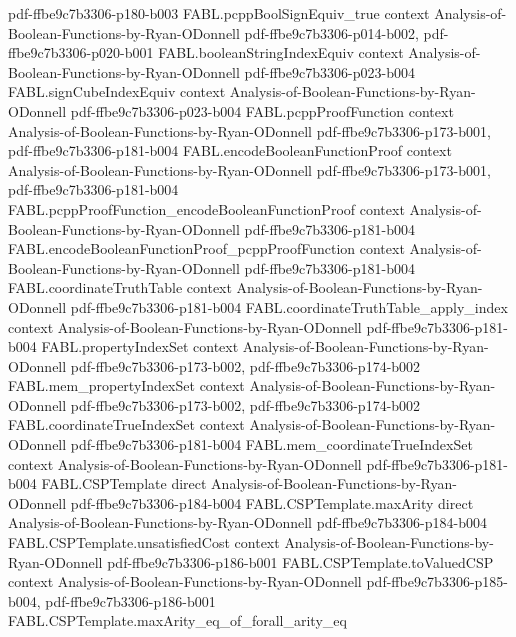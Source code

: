 \begin{theorem}
  {pdf-ffbe9c7b3306-p180-b003}
\proofstep
  {FABL.pcppBoolSignEquiv_true}
  {context}
  {Analysis-of-Boolean-Functions-by-Ryan-ODonnell}
  {pdf-ffbe9c7b3306-p014-b002,
    pdf-ffbe9c7b3306-p020-b001}
\proofstep
  {FABL.booleanStringIndexEquiv}
  {context}
  {Analysis-of-Boolean-Functions-by-Ryan-ODonnell}
  {pdf-ffbe9c7b3306-p023-b004}
\proofstep
  {FABL.signCubeIndexEquiv}
  {context}
  {Analysis-of-Boolean-Functions-by-Ryan-ODonnell}
  {pdf-ffbe9c7b3306-p023-b004}
\proofstep
  {FABL.pcppProofFunction}
  {context}
  {Analysis-of-Boolean-Functions-by-Ryan-ODonnell}
  {pdf-ffbe9c7b3306-p173-b001,
    pdf-ffbe9c7b3306-p181-b004}
\proofstep
  {FABL.encodeBooleanFunctionProof}
  {context}
  {Analysis-of-Boolean-Functions-by-Ryan-ODonnell}
  {pdf-ffbe9c7b3306-p173-b001,
    pdf-ffbe9c7b3306-p181-b004}
\proofstep
  {FABL.pcppProofFunction_encodeBooleanFunctionProof}
  {context}
  {Analysis-of-Boolean-Functions-by-Ryan-ODonnell}
  {pdf-ffbe9c7b3306-p181-b004}
\proofstep
  {FABL.encodeBooleanFunctionProof_pcppProofFunction}
  {context}
  {Analysis-of-Boolean-Functions-by-Ryan-ODonnell}
  {pdf-ffbe9c7b3306-p181-b004}
\proofstep
  {FABL.coordinateTruthTable}
  {context}
  {Analysis-of-Boolean-Functions-by-Ryan-ODonnell}
  {pdf-ffbe9c7b3306-p181-b004}
\proofstep
  {FABL.coordinateTruthTable_apply_index}
  {context}
  {Analysis-of-Boolean-Functions-by-Ryan-ODonnell}
  {pdf-ffbe9c7b3306-p181-b004}
\proofstep
  {FABL.propertyIndexSet}
  {context}
  {Analysis-of-Boolean-Functions-by-Ryan-ODonnell}
  {pdf-ffbe9c7b3306-p173-b002,
    pdf-ffbe9c7b3306-p174-b002}
\proofstep
  {FABL.mem_propertyIndexSet}
  {context}
  {Analysis-of-Boolean-Functions-by-Ryan-ODonnell}
  {pdf-ffbe9c7b3306-p173-b002,
    pdf-ffbe9c7b3306-p174-b002}
\proofstep
  {FABL.coordinateTrueIndexSet}
  {context}
  {Analysis-of-Boolean-Functions-by-Ryan-ODonnell}
  {pdf-ffbe9c7b3306-p181-b004}
\proofstep
  {FABL.mem_coordinateTrueIndexSet}
  {context}
  {Analysis-of-Boolean-Functions-by-Ryan-ODonnell}
  {pdf-ffbe9c7b3306-p181-b004}
\proofstep
  {FABL.CSPTemplate}
  {direct}
  {Analysis-of-Boolean-Functions-by-Ryan-ODonnell}
  {pdf-ffbe9c7b3306-p184-b004}
\proofstep
  {FABL.CSPTemplate.maxArity}
  {direct}
  {Analysis-of-Boolean-Functions-by-Ryan-ODonnell}
  {pdf-ffbe9c7b3306-p184-b004}
\proofstep
  {FABL.CSPTemplate.unsatisfiedCost}
  {context}
  {Analysis-of-Boolean-Functions-by-Ryan-ODonnell}
  {pdf-ffbe9c7b3306-p186-b001}
\proofstep
  {FABL.CSPTemplate.toValuedCSP}
  {context}
  {Analysis-of-Boolean-Functions-by-Ryan-ODonnell}
  {pdf-ffbe9c7b3306-p185-b004,
    pdf-ffbe9c7b3306-p186-b001}
\proofstep
  {FABL.CSPTemplate.maxArity_eq_of_forall_arity_eq}

\end{theorem}
